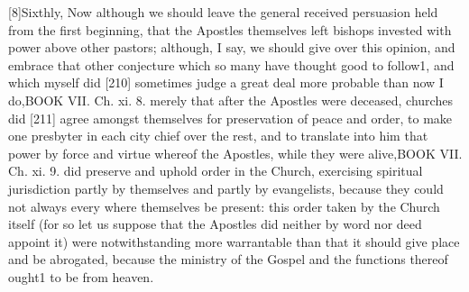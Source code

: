 [8]Sixthly, Now although we should leave the general received persuasion held from the first beginning, that the Apostles themselves left bishops invested with power above other pastors; although, I say, we should give over this opinion, and embrace that other conjecture which so many have thought good to follow1, and which myself did [210] sometimes judge a great deal more probable than now I do,BOOK VII. Ch. xi. 8. merely that after the Apostles were deceased, churches did [211] agree amongst themselves for preservation of peace and order, to make one presbyter in each city chief over the rest, and to translate into him that power by force and virtue whereof the Apostles, while they were alive,BOOK VII. Ch. xi. 9. did preserve and uphold order in the Church, exercising spiritual jurisdiction partly by themselves and partly by evangelists, because they could not always every where themselves be present: this order taken by the Church itself (for so let us suppose that the Apostles did neither by word nor deed appoint it) were notwithstanding more warrantable than that it should give place and be abrogated, because the ministry of the Gospel and the functions thereof ought1 to be from heaven.

